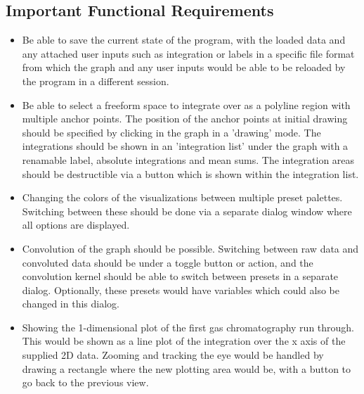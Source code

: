 \documentclass{article}
\begin{document}
\subsection*{Important Functional Requirements}
\begin{itemize}
    \item Be able to save the current state of the program, with the loaded data and any attached user inputs such as integration or labels in a specific file format from which the graph and any user inputs would be able to be reloaded by the program in a different session. 
	\item Be able to select a freeform space to integrate over as a polyline region with multiple anchor points. The position of the anchor points at initial drawing should be specified by clicking in the graph in a 'drawing' mode. The integrations should be shown in an 'integration list' under the graph with a renamable label, absolute integrations and mean sums. The integration areas should be destructible via a button which is shown within the integration list.
	\item Changing the colors of the visualizations between multiple preset palettes. Switching between these should be done via a separate dialog window where all options are displayed.
	\item Convolution of the graph should be possible. Switching between raw data and convoluted data should be under a toggle button or action, and the convolution kernel should be able to switch between presets in a separate dialog. Optionally, these presets would have variables which could also be changed in this dialog.
	\item Showing the 1-dimensional plot of the first gas chromatography run through. This would be shown as a line plot of the integration over the x axis of the supplied 2D data. Zooming and tracking the eye would be handled by drawing a rectangle where the new plotting area would be, with a button to go back to the previous view.
\end{itemize}
\end{document}

